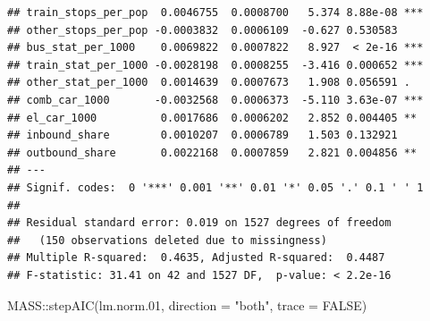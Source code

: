 \documentclass[
]{article}
\newenvironment{Shaded}{\begin{snugshade}}{\end{snugshade}}
\newcommand{\AttributeTok}[1]{\textcolor[rgb]{0.77,0.63,0.00}{#1}}
\newcommand{\ConstantTok}[1]{\textcolor[rgb]{0.00,0.00,0.00}{#1}}
\newcommand{\FloatTok}[1]{\textcolor[rgb]{0.00,0.00,0.81}{#1}}
\newcommand{\FunctionTok}[1]{\textcolor[rgb]{0.00,0.00,0.00}{#1}}
\newcommand{\NormalTok}[1]{#1}
\newcommand{\SpecialCharTok}[1]{\textcolor[rgb]{0.00,0.00,0.00}{#1}}
\newcommand{\StringTok}[1]{\textcolor[rgb]{0.31,0.60,0.02}{#1}}
\begin{document}
\begin{verbatim}
## train_stops_per_pop  0.0046755  0.0008700   5.374 8.88e-08 ***
## other_stops_per_pop -0.0003832  0.0006109  -0.627 0.530583    
## bus_stat_per_1000    0.0069822  0.0007822   8.927  < 2e-16 ***
## train_stat_per_1000 -0.0028198  0.0008255  -3.416 0.000652 ***
## other_stat_per_1000  0.0014639  0.0007673   1.908 0.056591 .  
## comb_car_1000       -0.0032568  0.0006373  -5.110 3.63e-07 ***
## el_car_1000          0.0017686  0.0006202   2.852 0.004405 ** 
## inbound_share        0.0010207  0.0006789   1.503 0.132921    
## outbound_share       0.0022168  0.0007859   2.821 0.004856 ** 
## ---
## Signif. codes:  0 '***' 0.001 '**' 0.01 '*' 0.05 '.' 0.1 ' ' 1
## 
## Residual standard error: 0.019 on 1527 degrees of freedom
##   (150 observations deleted due to missingness)
## Multiple R-squared:  0.4635, Adjusted R-squared:  0.4487 
## F-statistic: 31.41 on 42 and 1527 DF,  p-value: < 2.2e-16
\end{verbatim}

\begin{Shaded}
\begin{Highlighting}[]
\NormalTok{MASS}\SpecialCharTok{::}\FunctionTok{stepAIC}\NormalTok{(lm.norm}\FloatTok{.01}\NormalTok{, }\AttributeTok{direction =} \StringTok{"both"}\NormalTok{, }\AttributeTok{trace =} \ConstantTok{FALSE}\NormalTok{)}
\end{Highlighting}
\end{Shaded}
\end{document}
